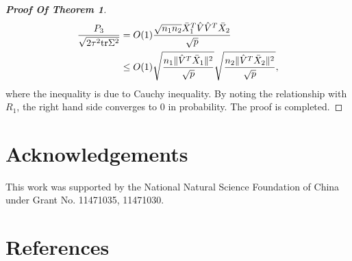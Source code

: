 \documentclass[review]{elsarticle}
\theoremstyle{plain}
\theoremstyle{definition}
\theoremstyle{remark}
\begin{document}
\begin{proof}[\textbf{Proof Of Theorem 1}]
\begin{align}
    \frac{P_3}{\sqrt{2\tau^2\mathrm{tr}\Sigma^2}}&=O(1)\frac{\sqrt{n_1n_2}\bar{X}_1^T\hat{V}\hat{V}^T\bar{X}_2}{\sqrt{p}}\notag
\\
    &\leq O(1)\sqrt{\frac{n_1\|\hat{V}^T\bar{X}_1\|^2}{\sqrt{p}}}\sqrt{\frac{{n_2}\|\hat{V}^T\bar{X}_2\|^2}{\sqrt{p}}},\notag
\end{align}
where the inequality is due to Cauchy inequality. By noting the relationship with  $R_1$, the right hand side converges to $0$ in probability. The proof is completed.



\end{proof}









\section*{Acknowledgements}
This work was supported by the National Natural Science Foundation of China under Grant No. 11471035, 11471030.


\section*{References}


\end{document}
